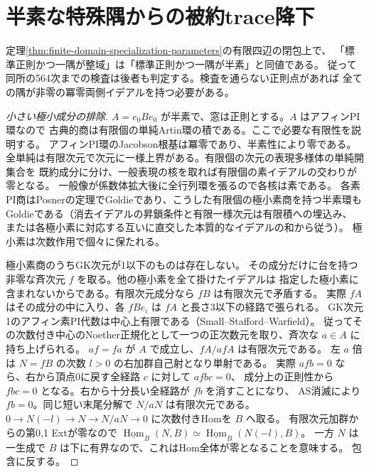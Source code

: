 \section{半素な特殊隅からの被約trace降下}
\label{sec:finite-semiprime-specialization}
\begin{theorem}\label{thm:finite-semiprime-specialization}
定理\ref{thm:finite-domain-specialization-parameters}の有限四辺の閉包上で、
「標準正則かつ一隅が整域」は「標準正則かつ一隅が半素」と同値である。
従って同所の564次までの検査は後者も判定する。検査を通らない正則点があれば
全ての隅が非零の冪零両側イデアルを持つ必要がある。
\end{theorem}
\begin{proof}[小さい極小成分の排除]
$A=e_0Be_0$ が半素で、窓は正則とする。$A$ はアフィンPI環なので
古典的商は有限個の単純Artin環の積である。ここで必要な有限性を説明する。
アフィンPI環のJacobson根基は冪零であり、半素性により零である。
全単純は有限次元で次元に一様上界がある。有限個の次元の表現多様体の単純開集合を
既約成分に分け、一般表現の核を取れば有限個の素イデアルの交わりが零となる。
一般像が係数体拡大後に全行列環を張るので各核は素である。
各素PI商はPosnerの定理でGoldieであり、こうした有限個の極小素商を持つ半素環も
Goldieである（消去イデアルの昇鎖条件と有限一様次元は有限積への埋込み、
または各極小素に対応する互いに直交した本質的なイデアルの和から従う）。
極小素は次数作用で個々に保たれる。

極小素商のうちGK次元が1以下のものは存在しない。
その成分だけに台を持つ非零な斉次元 $f$ を取る。他の極小素を全て掛けたイデアルは
指定した極小素に含まれないからである。有限次元成分なら $fB$ は有限次元で矛盾する。
実際 $fA$ はその成分の中に入り、各 $fBe_i$ は $fA$ と長さ3以下の経路で張られる。
GK次元1のアフィン素PI代数は中心上有限である（Small--Stafford--Warfield）。
従ってその次数付き中心のNoether正規化として一つの正次数元を取り、斉次な $a\in A$ に持ち上げられる。
$af=fa$ が $A$ で成立し、$fA/a fA$ は有限次元である。
左 $a$ 倍は $N=fB$ の次数 $l>0$ の右加群自己射となり単射である。
実際 $afb=0$ なら、右から頂点0に戻す全経路 $c$ に対して $afbc=0$、
成分上の正則性から $fbc=0$ となる。右から十分長い全経路が $fb$ を消すことになり、
AS消滅により $fb=0$。同じ短い末尾分解で $N/aN$ は有限次元である。
$0\to N(-l)\to N\to N/aN\to0$ に次数付きHomを $B$ へ取る。
有限次元加群からの第0,1 Extが零なので
$\underline{\operatorname{Hom}}_B(N,B)\simeq\underline{\operatorname{Hom}}_B(N(-l),B)$。
一方 $N$ は一生成で $B$ は下に有界なので、これはHom全体が零となることを意味する。
包含に反する。
\end{proof}

